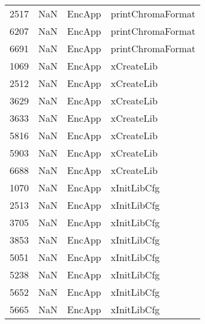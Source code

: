 \begin{tabular}{llll}
2517 &                   NaN &                     EncApp &                         printChromaFormat \\
6207 &                   NaN &                     EncApp &                         printChromaFormat \\
6691 &                   NaN &                     EncApp &                         printChromaFormat \\
1069 &                   NaN &                     EncApp &                                xCreateLib \\
2512 &                   NaN &                     EncApp &                                xCreateLib \\
3629 &                   NaN &                     EncApp &                                xCreateLib \\
3633 &                   NaN &                     EncApp &                                xCreateLib \\
5816 &                   NaN &                     EncApp &                                xCreateLib \\
5903 &                   NaN &                     EncApp &                                xCreateLib \\
6688 &                   NaN &                     EncApp &                                xCreateLib \\
1070 &                   NaN &                     EncApp &                               xInitLibCfg \\
2513 &                   NaN &                     EncApp &                               xInitLibCfg \\
3705 &                   NaN &                     EncApp &                               xInitLibCfg \\
3853 &                   NaN &                     EncApp &                               xInitLibCfg \\
5051 &                   NaN &                     EncApp &                               xInitLibCfg \\
5238 &                   NaN &                     EncApp &                               xInitLibCfg \\
5652 &                   NaN &                     EncApp &                               xInitLibCfg \\
5665 &                   NaN &                     EncApp &                               xInitLibCfg \\

\end{tabular}
